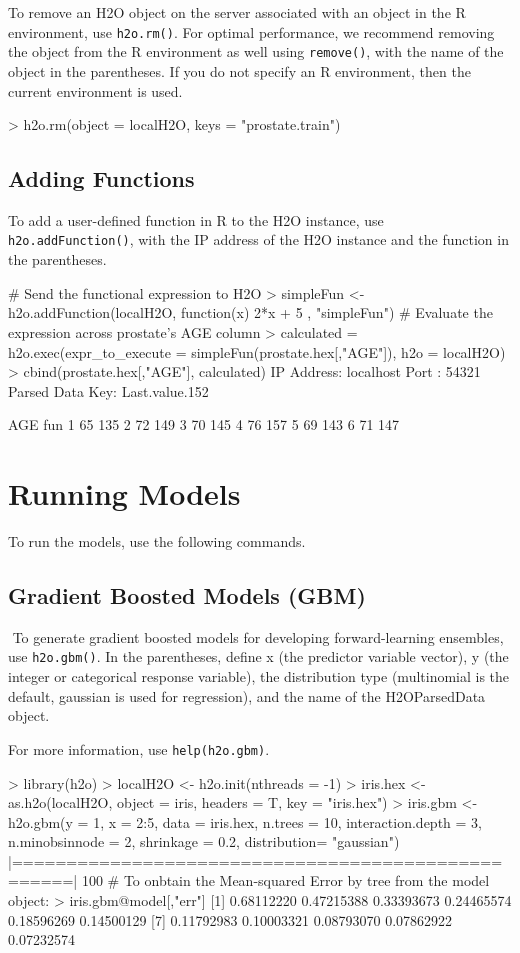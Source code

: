 \documentclass[11pt]{article}
\begin{document}
{To remove an H2O object on the server associated with an object in the R environment, use {\texttt{h2o.rm()}}. For optimal performance, we recommend removing the object from the R environment as well using {\texttt{remove()}}, with the name of the object in the parentheses. If you do not specify an R environment, then the current environment is used. 
\begin{spverbatim}
> h2o.rm(object = localH2O, keys = "prostate.train")
\end{spverbatim}


\subsection{Adding Functions}

To add a user-defined function in R to the H2O instance, use {\texttt{h2o.addFunction()}}, with the IP address of the H2O instance and the function in the parentheses.  
\begin{spverbatim}
# Send the functional expression to H2O
> simpleFun <- h2o.addFunction(localH2O, function(x) { 2*x + 5 }, "simpleFun")
# Evaluate the expression across prostate's AGE column
> calculated = h2o.exec(expr_to_execute = simpleFun(prostate.hex[,"AGE"]), h2o = localH2O)
> cbind(prostate.hex[,"AGE"], calculated)
IP Address: localhost 
Port      : 54321 
Parsed Data Key: Last.value.152 

  AGE fun
1  65 135
2  72 149
3  70 145
4  76 157
5  69 143
6  71 147
\end{spverbatim}


\section{Running Models}

To run the models, use the following commands. 
\subsection{Gradient Boosted Models (GBM)}
 To generate gradient boosted models for developing forward-learning ensembles, use {\texttt{h2o.gbm()}}.  In the parentheses, define x (the predictor variable vector), y (the integer or categorical response variable), the distribution type (multinomial is the default, gaussian is used for regression), and the name of the H2OParsedData object. 

For more information, use {\texttt{help(h2o.gbm)}}.
\begin{spverbatim}
> library(h2o)
> localH2O <- h2o.init(nthreads = -1)
> iris.hex <- as.h2o(localH2O, object = iris, headers = T, key = "iris.hex")
> iris.gbm <- h2o.gbm(y = 1, x = 2:5, data = iris.hex, n.trees = 10,
interaction.depth = 3, n.minobsinnode = 2, shrinkage = 0.2, distribution= "gaussian")
     |===================================================| 100%
# To onbtain the Mean-squared Error by tree from the model object:
> iris.gbm@model[,"err"]
 [1] 0.68112220 0.47215388 0.33393673 0.24465574 0.18596269 0.14500129
 [7] 0.11792983 0.10003321 0.08793070 0.07862922 0.07232574


\end{spverbatim}}
\end{document}
